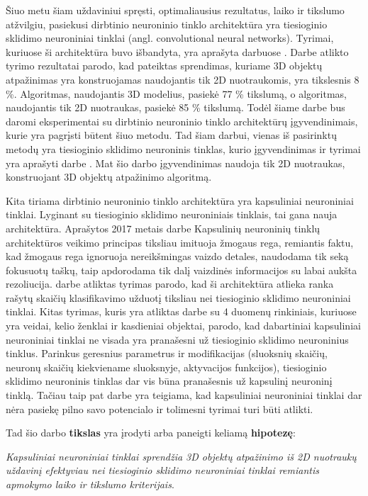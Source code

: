 Šiuo metu šiam uždaviniui spręsti, optimaliausius  rezultatus, laiko ir tikslumo atžvilgiu, pasiekusi dirbtinio neuroninio tinklo architektūra yra tiesioginio sklidimo neuroniniai tinklai (angl. convolutional neural networks). Tyrimai, kuriuose ši architektūra buvo išbandyta, yra aprašyta darbuose \cite{cnnExp1, cnnExp2}. Darbe \cite{dbnExp} atlikto tyrimo rezultatai parodo, kad pateiktas sprendimas, kuriame 3D objektų atpažinimas yra konstruojamas naudojantis tik 2D nuotraukomis, yra tikslesnis 8 \%. Algoritmas, naudojantis 3D modelius, pasiekė 77 \% tikslumą, o algoritmas, naudojantis tik 2D nuotraukas, pasiekė 85 \% tikslumą. Todėl šiame darbe bus daromi eksperimentai su dirbtinio neuroninio tinklo architektūrų įgyvendinimais, kurie yra pagrįsti būtent šiuo metodu. Tad šiam darbui, vienas iš pasirinktų metodų yra tiesioginio sklidimo neuroninis tinklas, kurio įgyvendinimas ir tyrimai yra aprašyti darbe \cite{cnnExp1}. Mat šio darbo įgyvendinimas naudoja tik 2D nuotraukas, konstruojant 3D objektų atpažinimo algoritmą.

Kita tiriama dirbtinio neuroninio tinklo architektūra yra kapsuliniai neuroniniai tinklai. Lyginant su tiesioginio sklidimo neuroniniais tinklais, tai gana nauja architektūra. Aprašytos 2017 metais \cite{capsNet} darbe Kapsulinių neuroninių tinklų architektūros veikimo principas tiksliau imituoja žmogaus rega, remiantis faktu, kad žmogaus rega ignoruoja nereikšmingas vaizdo detales, naudodama tik seką fokusuotų taškų, taip apdorodama tik dalį vaizdinės informacijos su labai aukšta rezoliucija. \cite{capsNet} darbe atliktas tyrimas parodo, kad ši architektūra atlieka ranka rašytų skaičių klasifikavimo užduotį tiksliau nei tiesioginio sklidimo neuroniniai tinklai. Kitas tyrimas, kuris yra atliktas darbe \cite{capsCNN} su 4 duomenų rinkiniais, kuriuose yra veidai, kelio ženklai ir kasdieniai objektai, parodo, kad dabartiniai kapsuliniai neuroniniai tinklai ne visada yra pranašesni už tiesioginio sklidimo neuroninius tinklus. Parinkus geresnius parametrus ir modifikacijas (sluoksnių skaičių, neuronų skaičių kiekviename sluoksnyje, aktyvacijos funkcijos), tiesioginio sklidimo neuroninis tinklas dar vis būna pranašesnis už kapsulinį neuroninį tinklą. Tačiau taip pat darbe \cite{capsCNN} yra teigiama, kad kapsuliniai neuroniniai tinklai dar nėra pasiekę pilno savo potencialo ir tolimesni tyrimai turi būti atlikti.

Tad šio darbo \textbf{tikslas} yra įrodyti arba paneigti keliamą \textbf{hipotezę}:

\textit{Kapsuliniai neuroniniai tinklai sprendžia 3D objektų atpažinimo iš 2D nuotraukų uždavinį efektyviau nei tiesioginio sklidimo neuroniniai tinklai remiantis apmokymo laiko ir tikslumo kriterijais}.

